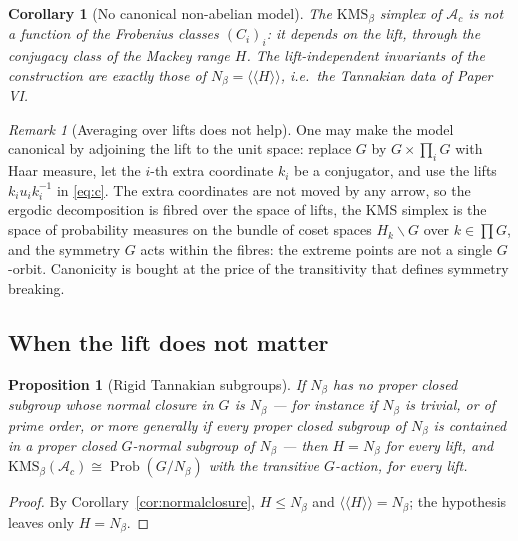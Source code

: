 \documentclass[11pt]{amsart}
\numberwithin{equation}{section}
\newtheorem{proposition}[theorem]{Proposition}
\newtheorem{corollary}[theorem]{Corollary}
\theoremstyle{definition}
\theoremstyle{remark}
\newtheorem{remark}[theorem]{Remark}
\newcommand{\cA}{\mathcal{A}}
\newcommand{\Prob}{\operatorname{Prob}}
\begin{document}
\begin{corollary}[No canonical non-abelian model]\label{cor:nocanonical}
The $\mathrm{KMS}_\beta$ simplex of $\cA_c$ is not a function of the Frobenius classes
$(C_i)_i$: it depends on the lift, through the conjugacy class of the Mackey range $H$. The
lift-independent invariants of the construction are exactly those of $N_\beta=\langle\langle H\rangle\rangle$,
i.e.\ the Tannakian data of Paper VI.
\end{corollary}

\begin{remark}[Averaging over lifts does not help]
One may make the model canonical by adjoining the lift to the unit space: replace $G$ by
$G\times\prod_iG$ with Haar measure, let the $i$-th extra coordinate $k_i$ be a conjugator,
and use the lifts $k_iu_ik_i^{-1}$ in \eqref{eq:c}. The extra coordinates are not moved by
any arrow, so the ergodic decomposition is fibred over the space of lifts, the KMS
simplex is the space of probability measures on the bundle of coset spaces
$H_k\backslash G$ over $k\in\prod G$, and the symmetry $G$ acts within the fibres: the
extreme points are not a single $G$-orbit. Canonicity is bought at the price of the
transitivity that defines symmetry breaking.
\end{remark}

\subsection{When the lift does not matter}

\begin{proposition}[Rigid Tannakian subgroups]\label{prop:rigid}
If $N_\beta$ has no proper closed subgroup whose normal closure in $G$ is $N_\beta$ --- for
instance if $N_\beta$ is trivial, or of prime order, or more generally if every proper
closed subgroup of $N_\beta$ is contained in a proper closed $G$-normal subgroup of
$N_\beta$ --- then $H=N_\beta$ for every lift, and
$\mathrm{KMS}_\beta(\cA_c)\cong\Prob(G/N_\beta)$ with the transitive $G$-action, for every lift.
\end{proposition}

\begin{proof}
By Corollary~\ref{cor:normalclosure}, $H\le N_\beta$ and $\langle\langle H\rangle\rangle=N_\beta$;
the hypothesis leaves only $H=N_\beta$.
\end{proof}
\end{document}
